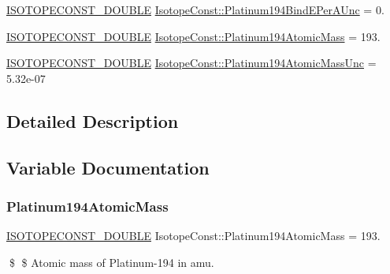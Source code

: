 \begin{DoxyCompactItemize}
\mbox{\hyperlink{group___isotope_const-_macros_ga8f45a7272ce02c0b4c65c44636ed719a}{I\+S\+O\+T\+O\+P\+E\+C\+O\+N\+S\+T\+\_\+\+D\+O\+U\+B\+LE}} \mbox{\hyperlink{group___isotope_const-_platinum-_pt194_ga44b1c1360943e342628b85fbf7fd720c}{Isotope\+Const\+::\+Platinum194\+Bind\+E\+Per\+A\+Unc}} = 0.
\item 
\mbox{\hyperlink{group___isotope_const-_macros_ga8f45a7272ce02c0b4c65c44636ed719a}{I\+S\+O\+T\+O\+P\+E\+C\+O\+N\+S\+T\+\_\+\+D\+O\+U\+B\+LE}} \mbox{\hyperlink{group___isotope_const-_platinum-_pt194_gab8279ece0e513042e13522adc65d52a9}{Isotope\+Const\+::\+Platinum194\+Atomic\+Mass}} = 193.
\item 
\mbox{\hyperlink{group___isotope_const-_macros_ga8f45a7272ce02c0b4c65c44636ed719a}{I\+S\+O\+T\+O\+P\+E\+C\+O\+N\+S\+T\+\_\+\+D\+O\+U\+B\+LE}} \mbox{\hyperlink{group___isotope_const-_platinum-_pt194_gaf0a843d90f28190bee20b4381d888e9b}{Isotope\+Const\+::\+Platinum194\+Atomic\+Mass\+Unc}} = 5.\+32e-\/07
\end{DoxyCompactItemize}


\subsection{Detailed Description}


\subsection{Variable Documentation}
\mbox{\label{group___isotope_const-_platinum-_pt194_gab8279ece0e513042e13522adc65d52a9}} 
\subsubsection{\texorpdfstring{Platinum194\+Atomic\+Mass}{Platinum194AtomicMass}}
{\footnotesize\ttfamily \mbox{\hyperlink{group___isotope_const-_macros_ga8f45a7272ce02c0b4c65c44636ed719a}{I\+S\+O\+T\+O\+P\+E\+C\+O\+N\+S\+T\+\_\+\+D\+O\+U\+B\+LE}} Isotope\+Const\+::\+Platinum194\+Atomic\+Mass = 193.}

\$ \$ Atomic mass of Platinum-\/194 in amu. \mbox{\label{group___isotope_const-_platinum-_pt194_gaf0a843d90f28190bee20b4381d888e9b}} 
